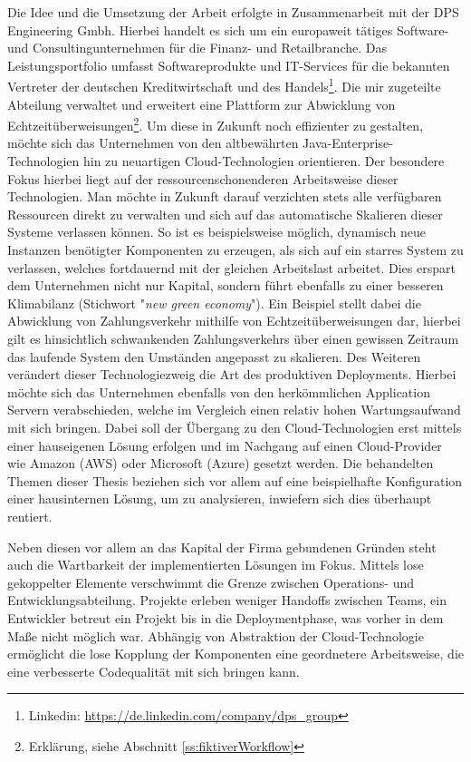 Die Idee und die Umsetzung der Arbeit erfolgte in Zusammenarbeit mit der DPS Engineering Gmbh. Hierbei handelt es sich um ein europaweit tätiges Software- und Consultingunternehmen für die Finanz- und Retailbranche. Das Leistungsportfolio umfasst Softwareprodukte und IT-Services für die bekannten Vertreter der deutschen Kreditwirtschaft und des Handels\footnote{Linkedin: \url{https://de.linkedin.com/company/dps_group}}. Die mir zugeteilte Abteilung verwaltet und erweitert eine Plattform zur Abwicklung von Echtzeitüberweisungen\footnote{Erklärung, siehe Abschnitt \ref{ss:fiktiverWorkflow}}. Um diese in Zukunft noch effizienter zu gestalten, möchte sich das Unternehmen von den altbewährten Java-Enterprise-Technologien hin zu neuartigen Cloud-Technologien orientieren. Der besondere Fokus hierbei liegt auf der ressourcenschonenderen Arbeitsweise dieser Technologien. Man möchte in Zukunft darauf verzichten stets alle verfügbaren Ressourcen direkt zu verwalten und sich auf das automatische Skalieren dieser Systeme verlassen können. So ist es beispielsweise möglich, dynamisch neue Instanzen benötigter Komponenten zu erzeugen, als sich auf ein starres System zu verlassen, welches fortdauernd mit der gleichen Arbeitslast arbeitet. Dies erspart dem Unternehmen nicht nur Kapital, sondern führt ebenfalls zu einer besseren Klimabilanz (Stichwort "\emph{new green economy}"). Ein Beispiel stellt dabei die Abwicklung von Zahlungsverkehr mithilfe von Echtzeitüberweisungen dar, hierbei gilt es hinsichtlich schwankenden Zahlungsverkehrs über einen gewissen Zeitraum das laufende System den Umständen angepasst zu skalieren. Des Weiteren verändert dieser Technologiezweig die Art des produktiven Deployments. Hierbei möchte sich das Unternehmen ebenfalls von den herkömmlichen Application Servern verabschieden, welche im Vergleich einen relativ hohen Wartungsaufwand mit sich bringen. Dabei soll der Übergang zu den Cloud-Technologien erst mittels einer hauseigenen Lösung erfolgen und im Nachgang auf einen Cloud-Provider wie Amazon (AWS) oder Microsoft (Azure) gesetzt werden. Die behandelten Themen dieser Thesis beziehen sich vor allem auf eine beispielhafte Konfiguration einer hausinternen Lösung, um zu analysieren, inwiefern sich dies überhaupt rentiert. 

Neben diesen vor allem an das Kapital der Firma gebundenen Gründen steht auch die Wartbarkeit der implementierten Lösungen im Fokus. Mittels lose gekoppelter Elemente verschwimmt die Grenze zwischen Operations- und Entwicklungsabteilung. Projekte erleben weniger Handoffs zwischen Teams, ein Entwickler betreut ein Projekt bis in die Deploymentphase, was vorher in dem Maße nicht möglich war. Abhängig von Abstraktion der Cloud-Technologie ermöglicht die lose Kopplung der Komponenten eine geordnetere Arbeitsweise, die eine verbesserte Codequalität mit sich bringen kann. 


